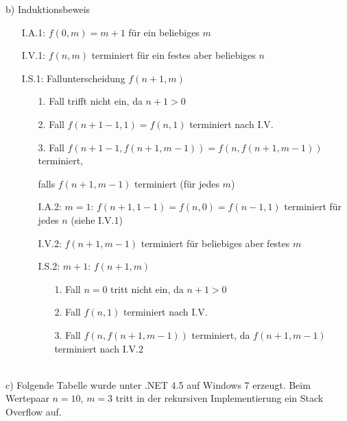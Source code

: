     b) Induktionsbeweis \\
    \begin{itemize}[noitemsep]
    	\item[I.A.1:] $f(0, m) = m + 1$ für ein beliebiges $m$
        \item[I.V.1:] $f(n, m)$ terminiert für ein festes aber beliebiges $n$
        \item[I.S.1:] Fallunterscheidung $f(n + 1, m)$
        	\subitem \begin{itemize}[noitemsep]
                \item[1. Fall] trifft nicht ein, da $n + 1 > 0$
                \item[2. Fall] $f(n + 1 - 1, 1) = f(n, 1)$ terminiert nach I.V.
                \item[3. Fall] $f(n + 1 - 1, f(n + 1, m - 1)) = f(n, f(n + 1, m - 1))$ terminiert, 
                \item[] falls $f(n + 1, m - 1)$ terminiert (für jedes $m$)
                \item[I.A.2:] $m = 1$: $f(n + 1, 1 - 1) = f(n, 0) = f(n - 1, 1)$ terminiert für jedes $n$ (siehe I.V.1)
                \item[I.V.2:] $f(n + 1, m - 1)$ terminiert für beliebiges aber festes $m$
                \item[I.S.2:] $m + 1$: $f(n + 1, m)$
                    \subitem \begin{itemize}[noitemsep]
                        \item[1. Fall] $n = 0$ tritt nicht ein, da $n + 1 > 0$
                        \item[2. Fall] $f(n, 1)$ terminiert nach I.V.
                        \item[3. Fall] $f(n, f(n + 1, m - 1))$ terminiert, da $f(n + 1, m - 1)$ terminiert nach I.V.2
                    \end{itemize}
            \end{itemize}
	\end{itemize}
    \nuffsaid \\[1cm]
    
    c) Folgende Tabelle wurde unter .NET 4.5 auf Windows 7 erzeugt. Beim Wertepaar $n = 10$, $m = 3$ tritt in der rekursiven Implementierung ein Stack Overflow auf.  \\[0.5cm]
    
    \bgroup
		\def\arraystretch{1.2}
        
